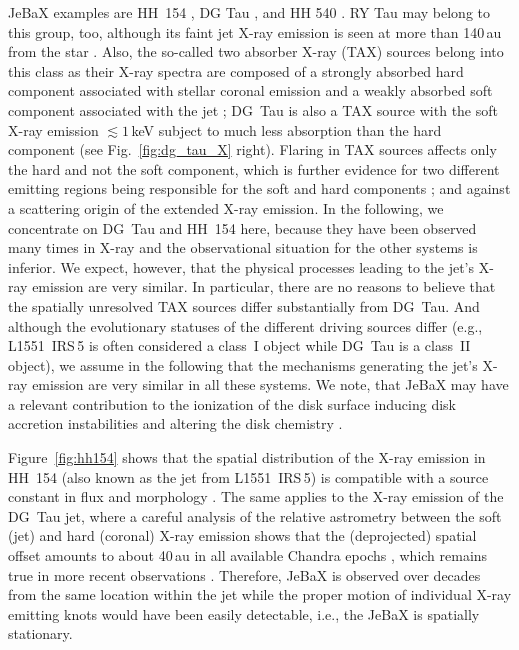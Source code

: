 \documentclass[graybox, nosecnum]{svmult}
\begin{document}
JeBaX examples are
HH~154 \citep{Favata_2002,Favata_2006,Schneider_2011,Bonito_2011}, DG Tau \citep[see Fig.~\ref{fig:dg_tau_X};][]{Guedel_2005,Guedel_2008,Schneider_2008}, and HH 540 \citep{Kastner_2005}. RY Tau  may belong to this group, too,  although its faint jet X-ray emission is seen at more than 140\,au from the star \citep{Skinner_2011}. Also, the so-called two absorber X-ray (TAX) sources belong into this class as their X-ray spectra are composed of a strongly absorbed hard component associated with stellar coronal emission and a weakly absorbed soft component associated with the jet \citep[][]{Guedel_2007}; DG~Tau is also a TAX source with the soft X-ray emission $\lesssim1$\,keV subject to much less absorption than the hard component (see Fig.~\ref{fig:dg_tau_X} right). Flaring in TAX sources affects only the hard and not the soft component, which is further evidence for two different emitting regions being responsible for the soft and hard components \citep{Guedel_2007}; and against a scattering origin of the extended X-ray emission. In the following, we concentrate on DG~Tau and HH~154 here, because they have been observed many times in X-ray and
the observational situation for the other systems is inferior. We expect, however, that the physical processes leading to the jet's X-ray emission are very similar. In particular, there are no reasons to believe that the spatially unresolved TAX sources differ substantially from DG~Tau.
And although the evolutionary statuses of the different driving sources differ (e.g., L1551~IRS\,5 is often considered a class~I object while DG~Tau is a class~II object), we assume in the following that the mechanisms generating the jet's X-ray emission are very similar in all these systems. We note, that JeBaX may have a relevant contribution to the ionization of the disk surface inducing disk accretion instabilities \cite{Balbus_1991} and altering the disk chemistry \cite{Glassgold_2004}.


Figure~\ref{fig:hh154} shows that the spatial distribution of the X-ray emission in HH~154 (also known as the jet from L1551~IRS\,5) is compatible with a source constant in flux and morphology  \cite{Schneider_2011,Bonito_2011}. The same applies to the  X-ray emission of the DG~Tau jet, where 
a careful analysis of the relative astrometry between the soft (jet) and hard (coronal) X-ray emission shows that the (deprojected) spatial offset amounts to about 40\,au in all available  Chandra  epochs \citep[see Fig.~\ref{fig:dg_tau_X} and ][]{Schneider_2008}, which remains true in more recent observations \citep{Guedel_2011}. Therefore, JeBaX is observed over decades from the same location within the jet while the proper motion of individual X-ray emitting knots would have been easily detectable, i.e., the JeBaX is spatially stationary.
\end{document}

